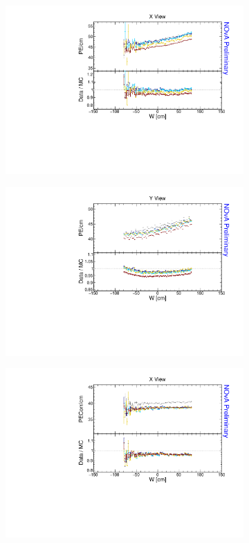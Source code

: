 \begin{figure}[!ht]
  \begin{subfigure}{0.495\textwidth}
    \includegraphics[width=\linewidth]{essentialsec_tb/pecm_w_x.pdf}
  \end{subfigure}
  \begin{subfigure}{0.495\textwidth}
    \includegraphics[width=\linewidth]{essentialsec_tb/pecm_w_y.pdf}
  \end{subfigure}
  \begin{subfigure}{0.495\textwidth}
    \includegraphics[width=\linewidth]{essentialsec_tb/pecorrcm_w_x.pdf}

\end{subfigure}
\end{figure}
